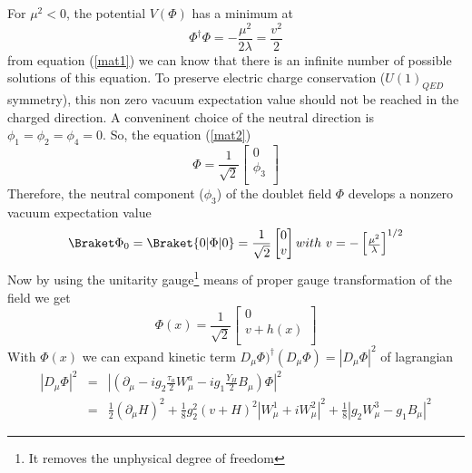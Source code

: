 For $\mu^2<0$, the potential $V(\Phi)$ has a minimum at
    \begin{equation}
    \Phi^{\dagger}\Phi = -\frac{\mu^2}{2\lambda}=\frac{v^2}{2}
    \end{equation}
from equation (\ref{mat1}) we can know that there is an infinite number of possible solutions of this equation. To preserve electric charge conservation ($U(1)_{QED}$ symmetry), this non zero vacuum expectation value should not be reached in the charged direction. A conveninent choice of the neutral direction is $\phi_1 = \phi_2 = \phi_4 = 0$. So, the equation (\ref{mat2})
    \begin{equation}
    \Phi=\frac{1}{\sqrt{2}}
        \begin{bmatrix}
        0   \\
        \phi_3  \\
        \end{bmatrix}
    \end{equation}
Therefore, the neutral component ($\phi_3$) of the doublet field $\Phi$ develops a nonzero vacuum expectation value
\begin{equation}
{\Braket\Phi}_0 = \Braket{0|\Phi|0}=\frac{1}{\sqrt{2}}
        \begin{bmatrix}
        0   \\
        v   \\
        \end{bmatrix}
        with~
        v=-
        \begin{bmatrix}
        \frac{\mu^2}{\lambda}
        \end{bmatrix}
        ^{1/2}
\end{equation}
Now by using the unitarity gauge\footnote{It removes the unphysical degree of freedom} means of proper gauge transformation of the field we get
    \begin{equation}
    \Phi (x)=\frac{1}{\sqrt{2}}
        \begin{bmatrix}
        0   \\
        v+h(x)  \\
        \end{bmatrix}
    \end{equation}
With $\Phi(x)$ we can expand kinetic term $D_\mu \Phi)^{\dagger} (D_\mu \Phi)=|D_\mu \Phi|^2$ of lagrangian
    \begin{eqnarray}\label{mat3}
    |D_{\mu} \Phi|^2 & = & |(\partial_{\mu}-ig_2\frac{\tau_a}{2}W^a_{\mu}-ig_1 \frac{Y_H}{2}B_{\mu})\Phi|^2 \nonumber \\
            & = & \frac{1}{2}(\partial_\mu H)^2+\frac{1}{8}g^2_2(v+H)^2|W^1_{\mu}+iW^2_\mu|^2+\frac{1}{8}|g_2W^3_\mu-g_1B_\mu|^2
    \end{eqnarray}
